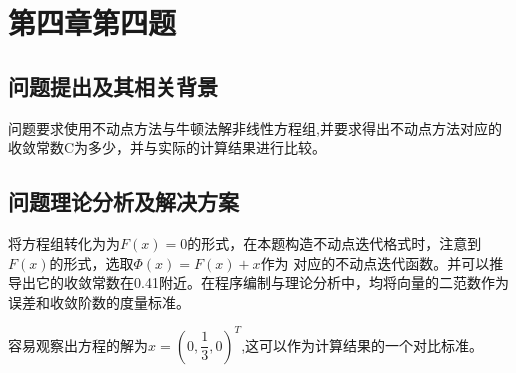 \documentclass{ctexart}
\begin{document}
\section{第四章第四题}
\subsection{问题提出及其相关背景}
问题要求使用不动点方法与牛顿法解非线性方程组,并要求得出不动点方法对应的收敛常数C为多少，并与实际的计算结果进行比较。
\subsection{问题理论分析及解决方案}
将方程组转化为为$F(x)=0$的形式，在本题构造不动点迭代格式时，注意到$F(x)$的形式，选取$\Phi(x)=F(x)+x$作为
对应的不动点迭代函数。并可以推导出它的收敛常数在0.41附近。在程序编制与理论分析中，均将向量的二范数作为误差和收敛阶数的度量标准。

容易观察出方程的解为$x=(0,\dfrac{1}{3},0)^T$,这可以作为计算结果的一个对比标准。
\end{document}
